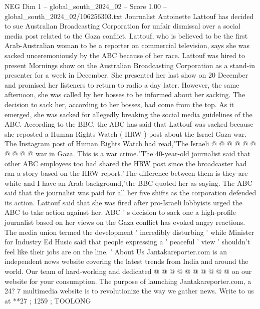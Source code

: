 \begin{textsample}{NEG Dim 1 – global\_south\_2024\_02 – Score 1.00 – global\_south\_2024\_02/106256303.txt}  \label{ex:f1_neg_247}
Journalist Antoinette Lattouf has decided to sue Australian Broadcasting Corporation for unfair dismissal over a social media post related to the Gaza conflict.
Lattouf, who is believed to be the first Arab-Australian woman to be a reporter on commercial television, says she was sacked unceremoniously by the ABC because of her race.
Lattouf was hired to present Mornings show on the Australian Broadcasting Corporation as a stand-in presenter for a week in December.
She presented her last show on 20 December and promised her listeners to return to radio a day later.
However, the same afternoon, she was called by her bosses to be informed about her sacking.
The decision to sack her, according to her bosses, had come from the top.
As it emerged, she was sacked for allegedly breaking the social media guidelines of the ABC.
According to the BBC, the ABC has said that Lattouf was sacked because she reposted a Human Rights Watch ( HRW ) post about the Israel Gaza war.
The Instagram post of Human Rights Watch had read,"The Israeli @ @ @ @ @ @ @ @ @ @ war in Gaza.
This is a war crime."The 40-year-old journalist said that other ABC employees too had shared the HRW post since the broadcaster had ran a story based on the HRW report."The difference between them is they are white and I have an Arab background,"the BBC quoted her as saying.
The ABC said that the journalist was paid for all her five shifts as the corporation defended its action.
Lattouf said that she was fired after pro-Israeli lobbyists urged the ABC to take action against her.
ABC ' s decision to sack one a high-profile journalist based on her views on the Gaza conflict has evoked angry reactions.
The media union termed the development ' incredibly disturbing ' while Minister for Industry Ed Husic said that people expressing a ' peaceful ' view ' shouldn't feel like their jobs are on the line. ' About Us Jantakareporter.com is an independent news website covering the latest trends from India and around the world.
Our team of hard-working and dedicated @ @ @ @ @ @ @ @ @ @ on our website for your consumption.
The purpose of launching Jantakareporter.com, a 24? 7 multimedia website is to revolutionize the way we gather news.
Write to us at **27 ; 1259 ; TOOLONG

\end{textsample}

